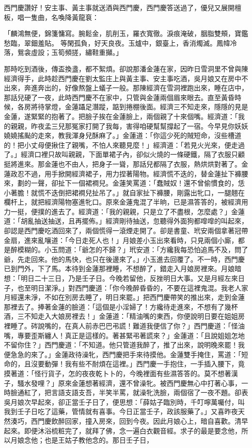 西門慶讚好！安主事、黃主事就送酒與西門慶，西門慶答送過了，優兒又展開檀板，唱一隻曲，名喚降黃龍袬：

「麟鴻無便，錦箋慵寫。腕鬆金，肌削玉，羅衣寬徹。淚痕淹破，胭脂雙頰，寶鑑愁臨，翠鈿羞貼。 等閑孤負，好天良夜。玉爐中，銀臺上，香消燭滅。鳳幃冷落，鴛衾虛設；玉筍頻搓，繡鞋重攧。」

那時吃到酒後，傳盃換盞，都不絮煩。卻說那潘金蓮在家，因昨日雪洞里不曾與陳經濟得手，此時趁西門慶在劉太監庄上與黃主事、安主事吃酒，吳月娘又在房中不出來，奔進奔出的，好像熬盤上蟻子一般。那陳經濟在雪洞裡跑出來，睡在店中，那話兒硬了一夜，此時西門慶不在家中，只管與金蓮兩個眉來眼去。直至黃昏時候，各房將待掌燈，金蓮躡足潛蹤，踮到捲棚後面。經濟三不知走來，隱隱的見是金蓮，遂緊緊的抱著了。把臉子挨在金蓮臉上，兩個親了十來個嘴。經濟道：「我的親親，昨夜孟三兒那冤家打開了我每，害得咱硬幫幫撐起了一宿。今早見你妖妖嬈嬈搖颭的走來，教我渾身兒酥麻了。」金蓮道：「你這少死的賊短命，沒些槽道的！把小丈母便揪住了親嘴，不怕人來聽見麼！」經濟道：「若見火光來，便走過了。」經濟口裡只故叫親親，下面單裙子內，卻似火燒的一條硬鐵，隔了衣服只顧挺將進來。那金蓮也不由人，把身子一聳，那話兒都隔了衣服，熱烘烘對著了。金蓮政忍不過，用手掀開經濟裙子，用力捏著陽物。經濟慌不迭的，替金蓮扯下褲腰來，劃的一聲，卻扯下一個裙襇兒。金蓮笑罵道：「蠢賊奴！還不曾偷慣食的，恁小著膽！就慌不迭倒把裙襇兒扯吊了。」就自家扯下褲腰，剛露出牝口，一腿翹在欄杆上，就把經濟陽物塞進牝口。原來金蓮鬼混了半晌，已是濕答答的，被經濟用力一挺，便撲的進去了。經濟道：「我的親親，只是立了不盡根，怎麼處？」金蓮道：「胡亂抽送抽送，且再擺佈。」經濟剛待抽送，忽聽得外面狗都噑噑的叫起來，卻認是西門慶吃酒回來了，兩個慌得一滾煙走開了。卻是書童、玳安兩個拿著冠帶金扇，進來亂嚷道：「今日走死人也！」月娘差小玉出來看時，只見兩個小廝，都是醉模糊的。小玉問道：「爺怎的不歸？」玳安道：「方纔我每恐怕追馬不及，問了爺，先走回來。他的馬快，也只在後邊來了。」小玉進去回覆了。不一時，西門慶已到門外，下了馬。本待到金蓮那裡睡，不想醉了，錯走入月娘房裡來。月娘暗想：「明日二十三日，乃是壬子日。今晚若留他，反挫明日大事。又是月經左來日子，也至明日潔淨。」對西門慶道：「你今晚醉昏昏的，不要在這裡鬼混。我老人家月經還未淨，不如在別房去睡了，明日來罷。」把西門慶帶笑的推出來，走到金蓮那裡去了。捧著金蓮的臉道：「這個是小淫婦了！方纔待走進來，不想有了幾杯酒，三不知走入大娘房裡去！」金蓮道：「精油嘴的東西，你便說明日要在姐姐房裡睡了。硶說嘴的，在真人前赤巴巴弔謊！難道我便信了你？」西門慶道：「怪油嘴，專要歪斯纏人！真正是這樣的。著甚緊弔著謊來？」金蓮道：「且說姐姐怎地不留你住？」西門慶道：「不知道。他只管道我醉了，推了出來，說明晚來罷！我便急急的來了。」金蓮政待澡牝，西門慶把手來待摸他。金蓮雙手掩住，罵道：「短命的，且沒要動彈！我有些不耐煩在這裡。」西門慶一手抱住，一手插入腰下，竟摸著道：「怪行貨子，怎的夜夜乾卜卜的，今晚裡面有些濕答答的。莫不想著漢子，騷水發哩？」原來金蓮想著經濟，還不曾澡牝。被西門慶無心中打著心事，一時臉通紅了，把言語支語支吾，半笑半罵，就澡牝洗臉，兩個宿了一夜不題。卻表吳月娘次早起來，卻正當壬子日了，便思想：「薛姑子臨別時，千叮嚀萬囑付，叫我到壬子日吃了這藥，管情就有喜事。今日正當壬子，政該服藥了。」又喜昨夜天然湊巧，西門慶飲醉回家，撞入房來，回到今夜。因此月娘心上，暗自喜歡。清早起來。即便沐浴梳粧完了，就拜了佛，念一遍白衣觀音經。求子的最是要念他，所以月娘念他；也是王姑子教他念的。那日壬子日，